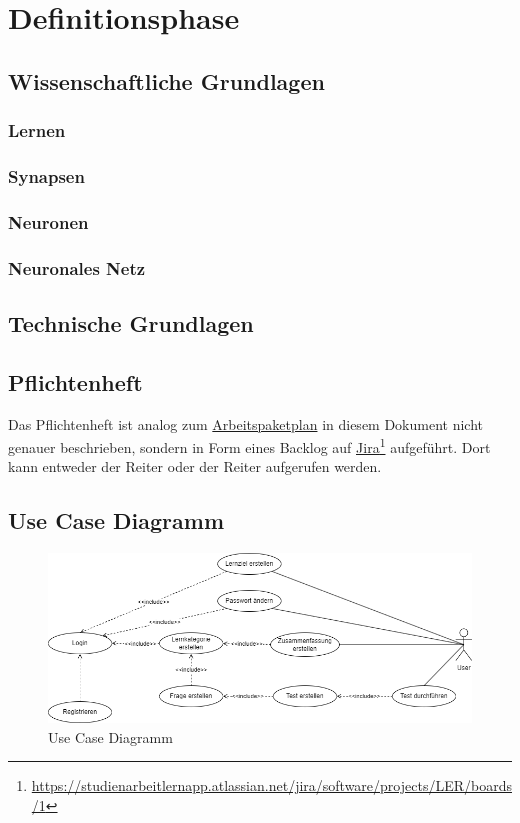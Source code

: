 \section{Definitionsphase}

\subsection{Wissenschaftliche Grundlagen}
\subsubsection{Lernen}
\subsubsection{Synapsen}
\subsubsection{Neuronen}
\subsubsection{Neuronales Netz}
\subsection{Technische Grundlagen}

\subsection{Pflichtenheft}
Das Pflichtenheft ist analog zum
\hyperref[sec:arbeitspaketplan]{Arbeitspaketplan} in diesem Dokument nicht
genauer beschrieben, sondern in Form eines Backlog auf
\href{https://studienarbeitlernapp.atlassian.net/jira/software/projects/LER/boards/1}{\underline{Jira}}\footnote{\href{https://studienarbeitlernapp.atlassian.net/jira/software/projects/LER/boards/1}{https://studienarbeitlernapp.atlassian.net/jira/software/projects/LER/boards/1}}
aufgeführt. Dort kann entweder der Reiter  oder der Reiter
 aufgerufen werden.

\subsection{Use Case Diagramm}

\begin{figure}[H]
  \centering
  \includegraphics[width=1\textwidth]{images/diagramme/UseCase_Diagramm.png}
  \caption{Use Case Diagramm}
  \label{fig:UseCaseDiagramm}
\end{figure}
\newpage
